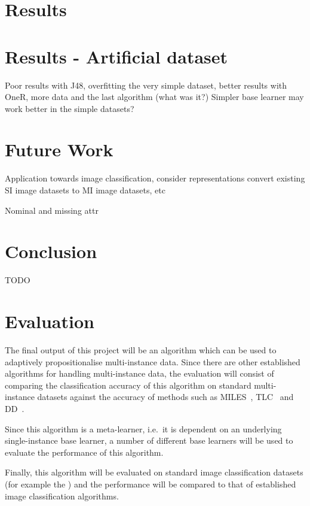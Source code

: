 \documentclass[a4paper,12pt]{article} %
\begin{document}


\section{Results}

\section{Results - Artificial dataset}

Poor results with J48, overfitting the very simple dataset, better results with 
    OneR, more data and the last algorithm (what was it?)
Simpler base learner may work better in the simple datasets?


\section{Future Work}
Application towards image classification, consider representations
    convert existing SI image datasets to MI image datasets, etc

Nominal and missing attr

\section{Conclusion}
TODO


\section{Evaluation}

The final output of this project will be an algorithm which can be used to adaptively propositionalise multi-instance data. Since there are other established algorithms for handling multi-instance data, the evaluation will consist of comparing the classification accuracy of this algorithm on standard multi-instance datasets against the accuracy of methods such as MILES~\cite{Chen2006}, TLC~\cite{Weidmann2003} and DD~\cite{Maron98mil}.

Since this algorithm is a meta-learner, i.e.\ it is dependent on an underlying single-instance base learner, a number of different base learners will be used to evaluate the performance of this algorithm.
 
Finally, this algorithm will be evaluated on standard image classification datasets (for example the ) and the performance will be compared to that of established image classification algorithms.
\end{document}
